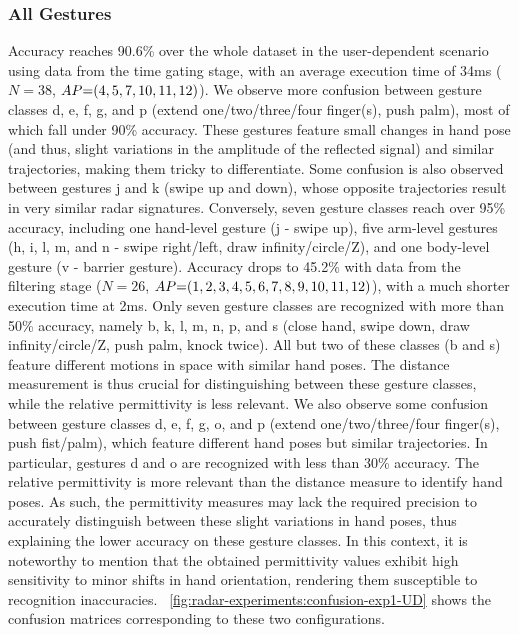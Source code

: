 \subsubsection{All Gestures} \label{sec:radar-experiments:gesture-subsets:results:all-gestures}
Accuracy reaches 90.6\% over the whole dataset in the user-dependent scenario using data from the time gating stage, with an average execution time of 34ms ($N{=}38$, $\splitatcommas{AP{=}(4, 5, 7, 10, 11, 12)}$). 
We observe more confusion between gesture classes d, e, f, g, and p (extend one/two/three/four finger(s), push palm), most of which fall under 90\% accuracy. These gestures feature small changes in hand pose (and thus, slight variations in the amplitude of the reflected signal) and similar trajectories, making them tricky to differentiate. Some confusion is also observed between gestures j and k (swipe up and down), whose opposite trajectories result in very similar radar signatures. Conversely, seven gesture classes reach over 95\% accuracy, including one hand-level gesture (j - swipe up), five arm-level gestures (h, i, l, m, and n - swipe right/left, draw infinity/circle/Z), and one body-level gesture (v - barrier gesture). 
%
Accuracy drops to 45.2\% with data from the filtering stage ($N{=}26$, $\splitatcommas{AP{=}(1, 2, 3, 4, 5, 6, 7, 8, 9, 10, 11, 12)}$), with a much shorter execution time at 2ms.
Only seven gesture classes are recognized with more than 50\% accuracy, namely b, k, l, m, n, p, and s (close hand, swipe down, draw infinity/circle/Z, push palm, knock twice). All but two of these classes (b and s) feature different motions in space with similar hand poses. The distance measurement is thus crucial for distinguishing between these gesture classes, while the relative permittivity is less relevant.
We also observe some confusion between gesture classes d, e, f, g, o, and p (extend one/two/three/four finger(s), push fist/palm), which feature different hand poses but similar trajectories. In particular, gestures d and o are recognized with less than 30\% accuracy. The relative permittivity is more relevant than the distance measure to identify hand poses. As such, the permittivity measures may lack the required precision to accurately distinguish between these slight variations in hand poses, thus explaining the lower accuracy on these gesture classes. In this context, it is noteworthy to mention that the obtained permittivity values exhibit high sensitivity to minor shifts in hand orientation, rendering them susceptible to recognition inaccuracies.
%
\fig~\ref{fig:radar-experiments:confusion-exp1-UD} shows the confusion matrices corresponding to these two configurations. 


